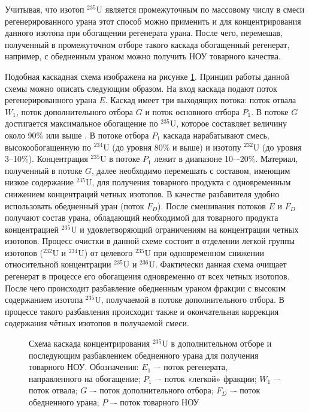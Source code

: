 Учитывая, что изотоп $^{235}$U является промежуточным по массовому числу в смеси регенерированного урана этот способ можно применить и для концентрирования данного изотопа при обогащении регенерата урана. После чего, перемешав, полученный в промежуточном отборе такого каскада обогащенный регенерат, например, с обедненным ураном можно получить НОУ товарного качества.

Подобная каскадная схема изображена на рисунке \ref{fig:enl}. Принцип работы данной схемы можно описать следующим образом. На вход каскада подают поток регенерированного урана $E$. Каскад имеет три выходящих потока: поток отвала $W_1$, поток дополнительного отбора $G$ и поток основного отбора $P_1$. В потоке $G$ достигается максимальное обогащение по $^{235}$U, которое составляет величину около 90\% или выше \cite{palkinRestorationIsotopicComposition2020}. В потоке отбора $P_1$ каскада нарабатывают смесь, высокообогащенную по $^{234}$U (до уровня 80\% и выше) и изотопу $^{232}$U (до уровня 3--10\%). Концентрация $^{235}$U в потоке $P_1$ лежит в диапазоне 10–-20\%. Материал, полученный в потоке $G$, далее необходимо перемешать с составом, имеющим низкое содержание $^{235}$U, для получения товарного продукта с одновременным снижением концентраций четных изотопов. В качестве разбавителя удобно использовать обедненный уран (поток $F_D$). После смешивания потоков $E$ и $F_D$ получают состав урана, обладающий необходимой для товарного продукта концентрацией $^{235}$U и удовлетворяющий ограничениям на концентрации четных изотопов.
Процесс очистки в данной схеме состоит в отделении легкой группы изотопов ($^{232}$U и $^{234}$U) от целевого $^{235}$U при одновременном снижении относительной концентрации $^{235}$U и $^{236}$U. Фактически данная схема очищает регенерат в процессе его обогащения одновременно от всех четных изотопов. После чего происходит разбавление обедненным ураном фракции с высоким содержанием изотопа $^{235}$U, получаемой в потоке дополнительного отбора. В процессе такого разбавления происходит также и окончательная коррекция содержания чётных изотопов в получаемой смеси.

\begin{figure}[ht]
  \caption{Схема каскада концентрирования $^{235}$U в дополнительном отборе и последующим разбавлением обедненного урана для получения товарного НОУ. Обозначения: $E_1$ –- поток регенерата, направленного на обогащение; $P_1$ –- поток «легкой» фракции; $W_1$ –- поток отвала; $G$ –- поток дополнительного отбора; $F_D$ –- поток обедненного урана; $P$ –- поток товарного НОУ
  }\label{fig:enl}
\end{figure}


